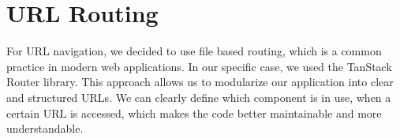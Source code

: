 \section{URL Routing}
For URL navigation, we decided to use file based routing, which is a common practice in modern web applications.
In our specific case, we used the TanStack Router library.
This approach allows us to modularize our application into clear and structured URLs.
We can clearly define which component is in use, when a certain URL is accessed, which makes the code better maintainable and more understandable.

